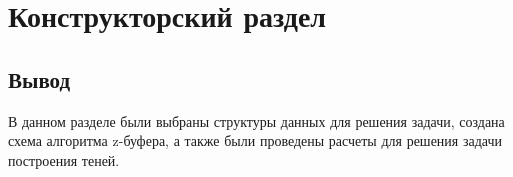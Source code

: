 \chapter{Конструкторский раздел}



\section{Вывод}
В данном разделе были выбраны структуры данных для решения задачи, создана схема алгоритма z-буфера, а также были проведены расчеты для решения задачи построения теней.